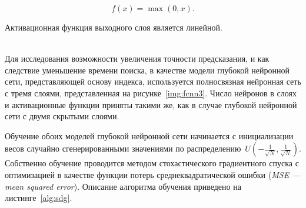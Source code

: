 
\begin{equation}\label{eq:eq01}
    f(x) = \max (0, x).
\end{equation}


Активационная функция выходного слоя является линейной.

~\\

Для исследования возможности увеличения точности предсказания, и как следствие
уменьшение времени поиска, в качестве модели глубокой нейронной сети,
представляющей основу индекса, используется полносвязная нейронная сеть с тремя
слоями, представленная на рисунке~\ref{img:fcnn3}. Число нейронов в слоях и
активационные функции приняты такими же, как в случае глубокой нейронной сети с
двумя скрытыми слоями.


Обучение обоих моделей глубокой нейронной сети начинается с инициализации весов
случайно сгенерированными значениями по распределению~$U(-\frac{1}{\sqrt{N}},
\frac{1}{\sqrt{N}})$. Собственно обучение проводится методом стохастического
градиентного спуска с оптимизацией в качестве функции потерь
среднеквадратической ошибки (\textit{MSE --- mean squared error}). Описание
алгоритма обучения приведено на листинге~\ref{alg:sdg}. 

